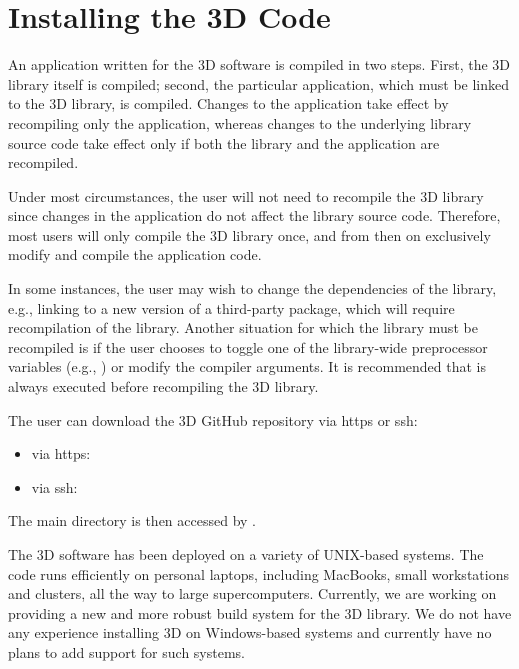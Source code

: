 %
%

\chapter{Installing the \hp3D Code}
\label{chap:installing}


An application written for the \hp3D software is compiled in two steps. First, the \hp3D library itself is compiled; second, the particular application, which must be linked to the \hp3D library, is compiled. Changes to the application take effect by recompiling only the application, whereas changes to the underlying library source code take effect only if both the library and the application are recompiled.

Under most circumstances, the user will not need to recompile the \hp3D library since changes in the application do not affect the library source code. Therefore, most users will only compile the \hp3D library once, and from then on exclusively modify and compile the application code.

In some instances, the user may wish to change the dependencies of the library, e.g., linking to a new version of a third-party package, which will require recompilation of the library. Another situation for which the library must be recompiled is if the user chooses to toggle one of the library-wide preprocessor variables (e.g., ) or modify the compiler arguments. It is recommended that  is always executed before recompiling the \hp3D library.

The user can download the \hp3D GitHub repository via https or ssh:
\begin{itemize}
	\item via https: 
	\item via ssh: 
\end{itemize}

The main directory is then accessed by .

\begin{remark}
The \hp3D software has been deployed on a variety of UNIX-based systems. The code runs efficiently on personal laptops, including MacBooks, small workstations and clusters, all the way to large supercomputers. Currently, we are working on providing a new and more robust build system for the \hp3D library. We do not have any experience installing \hp3D on Windows-based systems and currently have no plans to add support for such systems.
\end{remark}

